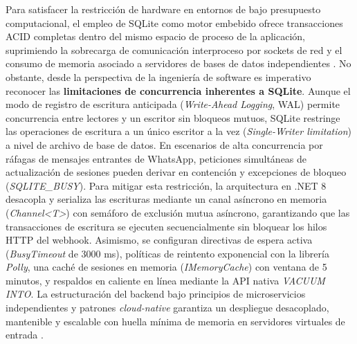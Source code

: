 Para satisfacer la restricción de hardware en entornos de bajo presupuesto computacional, el empleo de SQLite como motor embebido ofrece transacciones ACID completas dentro del mismo espacio de proceso de la aplicación, suprimiendo la sobrecarga de comunicación interproceso por sockets de red y el consumo de memoria asociado a servidores de bases de datos independientes \parencite{gaffney2022sqlite}. No obstante, desde la perspectiva de la ingeniería de software es imperativo reconocer las \textbf{limitaciones de concurrencia inherentes a SQLite}. Aunque el modo de registro de escritura anticipada (\textit{Write-Ahead Logging}, WAL) permite concurrencia entre lectores y un escritor sin bloqueos mutuos, SQLite restringe las operaciones de escritura a un único escritor a la vez (\textit{Single-Writer limitation}) a nivel de archivo de base de datos. En escenarios de alta concurrencia por ráfagas de mensajes entrantes de WhatsApp, peticiones simultáneas de actualización de sesiones pueden derivar en contención y excepciones de bloqueo (\textit{SQLITE\_BUSY}). Para mitigar esta restricción, la arquitectura en .NET 8 desacopla y serializa las escrituras mediante un canal asíncrono en memoria (\textit{Channel<T>}) con semáforo de exclusión mutua asíncrono, garantizando que las transacciones de escritura se ejecuten secuencialmente sin bloquear los hilos HTTP del webhook. Asimismo, se configuran directivas de espera activa (\textit{BusyTimeout} de 3000 ms), políticas de reintento exponencial con la librería \textit{Polly}, una caché de sesiones en memoria (\textit{IMemoryCache}) con ventana de 5 minutos, y respaldos en caliente en línea mediante la API nativa \textit{VACUUM INTO}. La estructuración del backend bajo principios de microservicios independientes y patrones \textit{cloud-native} garantiza un despliegue desacoplado, mantenible y escalable con huella mínima de memoria en servidores virtuales de entrada \parencite{kratzke2017understanding,newman2021building,taibi2020patterns}.

